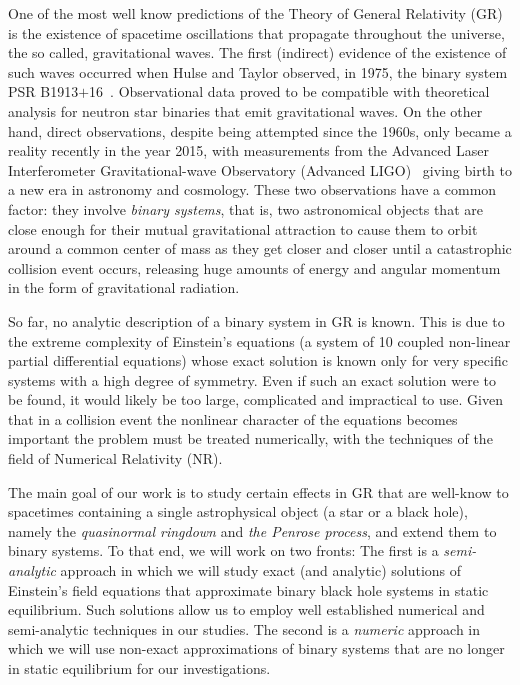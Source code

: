 One of the most well know predictions of the Theory of General Relativity (GR) is the existence of spacetime oscillations that propagate throughout the universe, the so called, gravitational waves. The first (indirect) evidence of the existence of such waves occurred when Hulse and Taylor observed, in 1975, the binary system PSR B1913$+$16~\cite{1975ApJ...195L..51H}. Observational data proved to be compatible with theoretical analysis for neutron star binaries that emit gravitational waves. On the other hand, direct observations, despite being attempted since the 1960s, only became a reality recently in the year 2015, with measurements from the Advanced Laser Interferometer Gravitational-wave Observatory (Advanced LIGO)~\cite{grav1,grav2} giving birth to a new era in astronomy and cosmology. These two observations have a common factor: they involve \emph{binary systems}, that is, two astronomical objects that are close enough for their mutual gravitational attraction to cause them to orbit around a common center of mass as they get closer and closer until a catastrophic collision event occurs, releasing huge amounts of energy and angular momentum in the form of gravitational radiation.

So far, no analytic description of a binary system in GR is known. This is due to the extreme complexity of Einstein's equations (a system of 10 coupled non-linear partial differential equations) whose exact solution is known only for very specific systems with a high degree of symmetry. Even if such an exact solution were to be found, it would likely be too large, complicated and impractical to use. Given that in a collision event the nonlinear character of the equations becomes important the problem must be treated numerically, with the techniques of the field of Numerical Relativity (NR).

The main goal of our work is to study certain effects in GR that are well-know to spacetimes containing a single astrophysical object (a star or a black hole), namely the \emph{quasinormal ringdown} and \emph{the Penrose process}, and extend them to binary systems. To that end, we will work on two fronts: The first is a \emph{semi-analytic} approach in which we will study exact (and analytic) solutions of Einstein's field equations that approximate binary black hole systems in static equilibrium. Such solutions allow us to employ well established numerical and semi-analytic techniques in our studies. The second is a \emph{numeric} approach in which we will use non-exact approximations of binary systems that are no longer in static equilibrium for our investigations.

